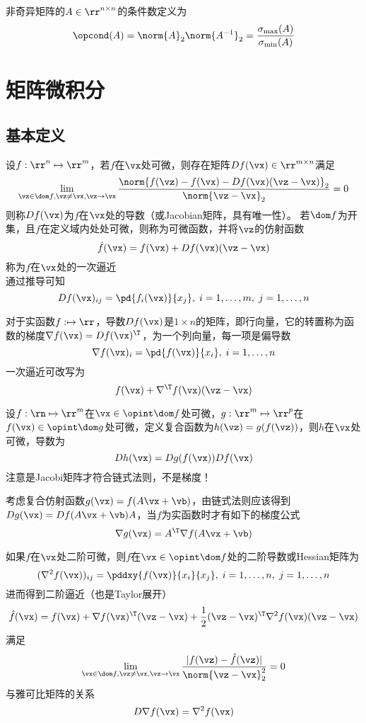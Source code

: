 \begin{definition}[条件数]
非奇异矩阵的$A\in\rr^{n\times n}$的条件数定义为
\[\opcond(A)=\norm{A}_2\norm{A^{-1}}_2=\frac{\sigma_{\max}(A)}{\sigma_{\min}(A)}\]
\end{definition}

\section{矩阵微积分}
\label{appendix:matrix}
\subsection{基本定义}
\begin{definition}[可微]
    设$f:\rr^n\mapsto\rr^m$，若$f$在$\vx$处可微，则存在矩阵$Df(\vx)\in\rr^{m\times n}$满足
    \[\lim_{\vz\in\dom f,\vz\ne\vx,\vz\to\vx}\frac{\norm{f(\vz)-f(\vx)-Df(\vx)(\vz-\vx)}_2}{\norm{\vz-\vx}_2}=0\]
    则称$Df(\vx)$为$f$在$\vx$处的导数（或Jacobian矩阵，具有唯一性）。
    若$\dom f$为开集，且$f$在定义域内处处可微，则称为可微函数，并将$\vz$的仿射函数
    \[\hat{f}(\vx)=f(\vx)+Df(\vx)(\vz-\vx)\]
    称为$f$在$\vx$处的一次逼近\\
    通过推导可知
    \[Df(\vx)_{ij}=\pd{f_i(\vx)}{x_j},\;i=1,\ldots,m,\;j=1,\ldots,n\]
\end{definition}
\begin{definition}[梯度]
    对于实函数$f:\rm\mapsto\rr$，导数$Df(\vx)$是$1\times n$的矩阵，即行向量，它的转置称为函数的梯度$\nabla f(\vx)=Df(\vx)^\T$，为一个列向量，每一项是偏导数
    \[\nabla f(\vx)_i=\pd{f(\vx)}{x_i},\;i=1,\ldots,n\]
    一次逼近可改写为
    \[f(\vx)+\nabla^\T f(\vx)(\vz-\vx)\]
\end{definition}
\begin{theorem}[链式法则]
    设$f:\rn\mapsto\rr^m$在$\vx\in\opint\dom f$处可微，$g:\rr^m\mapsto\rr^p$在$f(\vx)\in\opint\dom g$处可微，定义复合函数为$h(\vz)=g(f(\vz))$，则$h$在$\vx$处可微，导数为
    \[Dh(\vx)=Dg(f(\vx))Df(\vx)\]
    注意是Jacobi矩阵才符合链式法则，不是梯度！
\end{theorem}
考虑复合仿射函数$g(\vx)=f(A\vx+\vb)$，由链式法则应该得到$Dg(\vx)=Df(A\vx+\vb)A$，当$f$为实函数时才有如下的梯度公式
\[\nabla g(\vx)=A^\T\nabla f(A\vx+\vb)\]

\begin{definition}[二阶导数]
    如果$f$在$\vx$处二阶可微，则$f$在$\vx\in\opint\dom f$处的二阶导数或Hessian矩阵为
    \[(\nabla^2 f(\vx))_{ij}=\pddxy{f(\vx)}{x_i}{x_j},\;i=1,\ldots,n,\;j=1,\ldots,n\]
    进而得到二阶逼近（也是Taylor展开）
    \[\hat{f}(\vx)=f(\vx)+\nabla f(\vx)^\T(\vz-\vx)+\frac{1}{2}(\vz-\vx)^\T\nabla^2 f(\vx)(\vz-\vx)\]
    满足
    \[\lim_{\vx\in\dom f,\vz\ne\vx,\vz\to\vx}\frac{|f(\vz)-\hat{f}(\vz)|}{\norm{\vz-\vx}_2^2}=0\]
    与雅可比矩阵的关系
    \[D\nabla f(\vx)=\nabla^2 f(\vx)\]
\end{definition}

